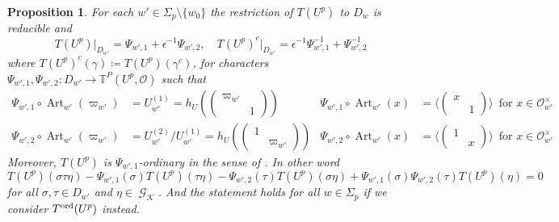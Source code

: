 \documentclass[leqno]{amsart}
\newtheorem{prop}[thm]{Proposition}
\theoremstyle{definition}
\theoremstyle{remark}
\newcommand{\smat}[1]{\left(\begin{smallmatrix} #1 \end{smallmatrix}\right)}
\newcommand{\oo}{\mathcal{O}}
\DeclareMathOperator{\Gal}{\mathcal{G}}
\DeclareMathOperator{\Art}{Art}
\newcommand{\K}{{\mathcal{K}}} %
\newcommand{\TT}{\mathbb{T}} %
\newcommand{\ord}{\textnormal{ord}} %
\begin{document}
\begin{prop}\label{prop:big_char_at_p}
    For each $w'\in \Sigma_p\setminus\{w_0\}$
    the restriction of $T(U^p)$ to $D_w$
    is reducible and 
    \[
        T(U^p)\vert_{D_{w'}}=\Psi_{w',1}+
        \epsilon^{-1}\Psi_{w',2},\quad
        T(U^p)^c\vert_{D_{w'}}=\epsilon^{-1}\Psi_{w',1}^{-1}+
        \Psi_{w',2}^{-1}
    \]
    where $T(U^p)^c(\gamma)\coloneqq T(U^p)(\gamma^c)$,
    for characters 
    $\Psi_{w',1},\Psi_{w',2}\colon D_{w'}\to \TT^P(U^p,\oo)$
    such that
	\begin{equation}
	\begin{aligned}
		\Psi_{w',1}\circ \Art_{w'}(\varpi_{w'})&=
		U_{w'}^{(1)}=h_U(\smat{\varpi_{w'}&\\&1}) &
		\Psi_{w',1}\circ \Art_{w'}(x)&=
		\langle 
		(\begin{smallmatrix}
			x&\\&1
		\end{smallmatrix})
		\rangle\, \text{ for }x\in \oo_{w'}^{\times}\\
		\Psi_{w',2}\circ \Art_{w'}(\varpi_{w'})&=
		U_{w'}^{(2)}/
		U_{w'}^{(1)} =h_U(\smat{1&\\&\varpi_{w'}}) &
		\Psi_{w',2}\circ \Art_{w'}(x)&=
		\langle 
		(\begin{smallmatrix}
			1&\\&x
		\end{smallmatrix})
		\rangle\, \text{ for }x\in \oo_{w'}^{\times}
	\end{aligned}
	\end{equation}
    Moreover, $T(U^p)$ is $\Psi_{w',1}$-ordinary 
    in the sense of \cite[Def 5.2.3]{pan}.
    In other word 
    \[
        T(U^p)(\sigma\tau\eta)
        -\Psi_{w',1}(\sigma)T(U^p)(\tau\eta)
        -\Psi_{w',2}(\tau)T(U^p)(\sigma\eta)
        +\Psi_{w',1}(\sigma)\Psi_{w',2}(\tau)T(U^p)(\eta)=0
    \]
    for all $\sigma, \tau\in D_{w'}$ and $\eta\in\Gal_\K$.
    And the statement holds for all $w\in \Sigma_p$
    if we consider $T^{\ord}(U^p)$ instead.
\end{prop}
\end{document}
